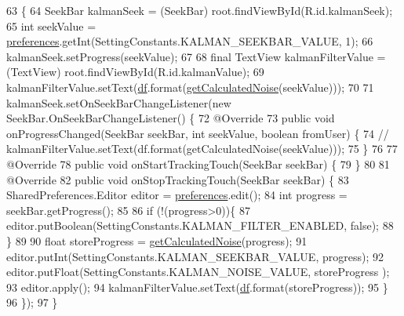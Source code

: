 \begin{DoxyCode}
63                                                    \{
64         SeekBar kalmanSeek = (SeekBar) root.findViewById(R.id.kalmanSeek);
65         \textcolor{keywordtype}{int} seekValue = \hyperlink{classit_1_1unibo_1_1torsello_1_1bluetoothpositioning_1_1fragment_1_1SettingsFragment_a52480c4d5d81ca59fe4a98ae3c623ea4_a52480c4d5d81ca59fe4a98ae3c623ea4}{preferences}.getInt(SettingConstants.KALMAN\_SEEKBAR\_VALUE, 1);
66         kalmanSeek.setProgress(seekValue);
67 
68         \textcolor{keyword}{final} TextView kalmanFilterValue = (TextView) root.findViewById(R.id.kalmanValue);
69         kalmanFilterValue.setText(\hyperlink{classit_1_1unibo_1_1torsello_1_1bluetoothpositioning_1_1fragment_1_1SettingsFragment_af6b80a700dc80c39a56d001b68a47694_af6b80a700dc80c39a56d001b68a47694}{df}.format(\hyperlink{classit_1_1unibo_1_1torsello_1_1bluetoothpositioning_1_1fragment_1_1SettingsFragment_a595d859602f34ca81957a0578c1602a6_a595d859602f34ca81957a0578c1602a6}{getCalculatedNoise}(seekValue)));
70 
71         kalmanSeek.setOnSeekBarChangeListener(\textcolor{keyword}{new} SeekBar.OnSeekBarChangeListener() \{
72             @Override
73             \textcolor{keyword}{public} \textcolor{keywordtype}{void} onProgressChanged(SeekBar seekBar, \textcolor{keywordtype}{int} seekValue, \textcolor{keywordtype}{boolean} fromUser) \{
74 \textcolor{comment}{//                kalmanFilterValue.setText(df.format(getCalculatedNoise(seekValue)));}
75             \}
76 
77             @Override
78             \textcolor{keyword}{public} \textcolor{keywordtype}{void} onStartTrackingTouch(SeekBar seekBar) \{
79             \}
80 
81             @Override
82             \textcolor{keyword}{public} \textcolor{keywordtype}{void} onStopTrackingTouch(SeekBar seekBar) \{
83                 SharedPreferences.Editor editor = \hyperlink{classit_1_1unibo_1_1torsello_1_1bluetoothpositioning_1_1fragment_1_1SettingsFragment_a52480c4d5d81ca59fe4a98ae3c623ea4_a52480c4d5d81ca59fe4a98ae3c623ea4}{preferences}.edit();
84                 \textcolor{keywordtype}{int} progress = seekBar.getProgress();
85 
86                 \textcolor{keywordflow}{if} (!(progress>0))\{
87                     editor.putBoolean(SettingConstants.KALMAN\_FILTER\_ENABLED, \textcolor{keyword}{false});
88                 \}
89 
90                 \textcolor{keywordtype}{float} storeProgress  = \hyperlink{classit_1_1unibo_1_1torsello_1_1bluetoothpositioning_1_1fragment_1_1SettingsFragment_a595d859602f34ca81957a0578c1602a6_a595d859602f34ca81957a0578c1602a6}{getCalculatedNoise}(progress);
91                 editor.putInt(SettingConstants.KALMAN\_SEEKBAR\_VALUE, progress);
92                 editor.putFloat(SettingConstants.KALMAN\_NOISE\_VALUE, storeProgress );
93                 editor.apply();
94                 kalmanFilterValue.setText(\hyperlink{classit_1_1unibo_1_1torsello_1_1bluetoothpositioning_1_1fragment_1_1SettingsFragment_af6b80a700dc80c39a56d001b68a47694_af6b80a700dc80c39a56d001b68a47694}{df}.format(storeProgress));
95             \}
96         \});
97     \}
\end{DoxyCode}
